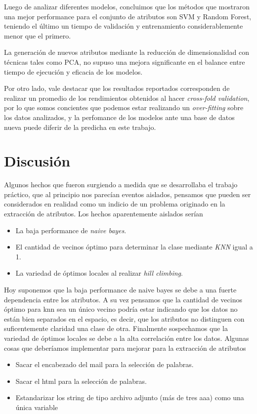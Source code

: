 \documentclass[a4paper,10pt]{article}
\begin{document}
\par Luego de analizar diferentes modelos, concluimos que los métodos que mostraron una mejor performance para el conjunto de atributos son SVM y Random Forest, teniendo el último un tiempo de validación y entrenamiento considerablemente menor que el primero.
\par La generación de nuevos atributos mediante la reducción de dimensionalidad con técnicas tales como PCA, no supuso una mejora significante en el balance entre tiempo de ejecución y eficacia de los modelos. 
\par Por otro lado, vale destacar que los resultados reportados corresponden de realizar un promedio de los rendimientos obtenidos al hacer \emph{cross-fold validation}, por lo que somos concientes que podemos estar realizando un \emph{over-fitting} sobre los datos analizados, y la perfomance de los modelos ante una base de datos nueva puede diferir de la predicha en este trabajo. 

\section{Discusi\'on}

Algunos hechos que fueron surgiendo a medida que se desarrollaba el trabajo pr\'actico, que al principio nos parec\'ian eventos aislados, pensamos que pueden ser considerados en realidad como un indicio de un problema originado en la extracci\'on de atributos. Los hechos aparentemente aislados ser\'ian

\begin{itemize}
 \item La baja performance de \emph{naive bayes}. 
 \item El cantidad de vecinos \'optimo para determinar la clase mediante \emph{KNN} igual a 1. 
 \item La variedad de \'optimos locales al realizar \emph{hill climbing}. 
\end{itemize}

Hoy suponemos que la baja performance de naive bayes se debe a una fuerte dependencia entre los atributos. A su vez pensamos que la cantidad de vecinos \'optimo para knn sea un \'unico vecino podr\'ia estar indicando que los datos no est\'an bien separados en el espacio, es decir, que los atributos no distinguen con suficentemente claridad una clase de otra. Finalmente sospechamos que la variedad de \'optimos locales se debe a la alta correlaci\'on entre los datos. 
Algunas cosas que deber\'iamos implementar para mejorar para la extracci\'on de atributos 

\begin{itemize}
 \item Sacar el encabezado del mail para la selecci\'on de palabras. 
 \item Sacar el html para la selecci\'on de palabras. 
 \item Estandarizar los string de tipo archivo adjunto (m\'as de tres aaa) como una \'unica variable 
\end{itemize}






\scriptsize


\end{document}

